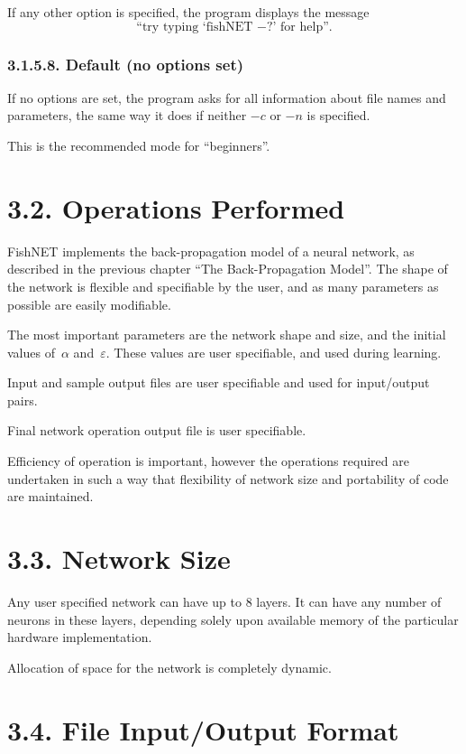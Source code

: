 \documentclass[12pt]{report}
\begin{document}
If any other option is specified, the program displays the message 
$$
\text{``try typing `fishNET $-?$' for help''.}
$$

\subsubsection{3.1.5.8. Default (no options set)}

If no options are set, the program asks for all information about
file names and parameters, the same way it does if neither $-c$ or
$-n$ is specified.

This is the recommended mode for ``beginners''.

\section{3.2. Operations Performed}

FishNET implements the back-propagation model of a
neural network, as described in the previous chapter ``The Back-Propagation
Model''.
The shape of the network is flexible and specifiable by the user,
and as many parameters as possible are easily modifiable.

The most important parameters are the network shape and size,
and the initial values of~$\alpha$ and~$\varepsilon$.
These values are user specifiable, and used during learning.

Input and sample output files are user specifiable and used for
input/output pairs.

Final network operation output file is user specifiable.

Efficiency of operation is important, however the operations required
are undertaken in such a way that flexibility of network size and
portability of code are maintained.

\section{3.3. Network Size}

Any user specified network can have up to $8$ layers.
It can have any number of neurons in these layers, depending solely upon
available memory of the particular hardware implementation.

Allocation of space for the network is completely dynamic.

\section{3.4. File Input/Output Format}
\end{document}
